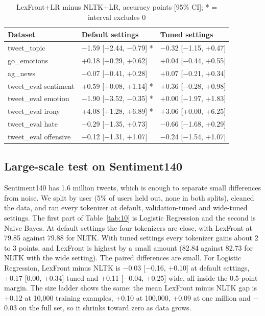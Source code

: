 \documentclass[journal,a4paper]{IEEEtran}
\begin{document}
\begin{table}[!tb]
\caption{LexFront+LR minus NLTK+LR, accuracy points [95\% CI]; * = interval excludes 0}\label{tab:9}
\centering
\footnotesize
\setlength{\tabcolsep}{3pt}
\begin{tabular}{lll}
\toprule
\textbf{Dataset} & \textbf{Default settings} & \textbf{Tuned settings} \\
\midrule
tweet\_topic & $-$1.59 [$-$2.44, $-$0.79] * & $-$0.32 [$-$1.15, +0.47] \\
go\_emotions & +0.18 [$-$0.29, +0.62] & +0.04 [$-$0.44, +0.55] \\
ag\_news & $-$0.07 [$-$0.41, +0.28] & +0.07 [$-$0.21, +0.34] \\
tweet\_eval sentiment & +0.59 [+0.08, +1.14] * & +0.36 [$-$0.28, +0.98] \\
tweet\_eval emotion & $-$1.90 [$-$3.52, $-$0.35] * & +0.00 [$-$1.97, +1.83] \\
tweet\_eval irony & +4.08 [+1.28, +6.89] * & +3.06 [+0.00, +6.25] \\
tweet\_eval hate & $-$0.29 [$-$1.35, +0.73] & $-$0.66 [$-$1.68, +0.29] \\
tweet\_eval offensive & $-$0.12 [$-$1.31, +1.07] & $-$0.24 [$-$1.54, +1.07] \\
\bottomrule
\end{tabular}
\end{table}

\subsection{Large-scale test on Sentiment140}\label{sec:4.7}
Sentiment140 has 1.6 million tweets, which is enough to separate small differences from noise. We split by user (5\% of users held out, none in both splits), cleaned the data, and ran every tokenizer at default, validation-tuned and wide-tuned settings. The first part of Table~\ref{tab:10} is Logistic Regression and the second is Naive Bayes. At default settings the four tokenizers are close, with LexFront at 79.85 against 79.88 for NLTK. With tuned settings every tokenizer gains about 2 to 3 points, and LexFront is highest by a small amount (82.84 against 82.73 for NLTK with the wide setting). The paired differences are small. For Logistic Regression, LexFront minus NLTK is $-$0.03 [$-$0.16, +0.10] at default settings, +0.17 [0.00, +0.34] tuned and +0.11 [$-$0.04, +0.25] wide, all inside the 0.5-point margin. The size ladder shows the same: the mean LexFront minus NLTK gap is +0.12 at 10,000 training examples, +0.10 at 100,000, +0.09 at one million and $-$0.03 on the full set, so it shrinks toward zero as data grows.
\end{document}

